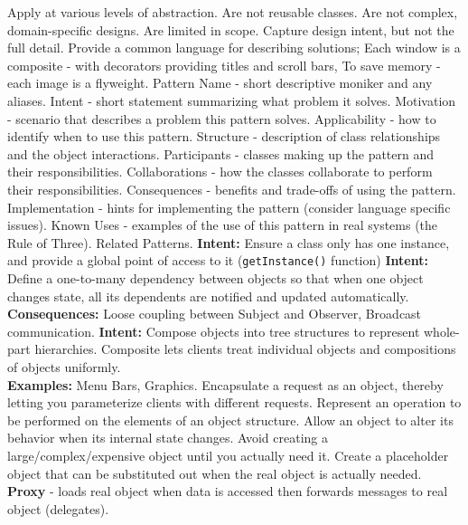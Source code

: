\documentclass[number]{assignment}
\begin{document}
\begin{landscape}
\begin{multicols}{3}
Apply at various levels of abstraction. Are not reusable classes. Are not complex, domain-specific designs. Are limited in scope. Capture design intent, but not the full detail.
Provide a common language for describing solutions; Each window is a composite - with decorators providing titles and scroll bars, To save memory - each image is a flyweight.
Pattern Name - short descriptive moniker and any aliases. Intent - short statement summarizing what problem it solves. Motivation - scenario that describes a problem this pattern solves. Applicability - how to identify when to use this pattern. Structure - description of class relationships and the object interactions. Participants - classes making up the pattern and their responsibilities. Collaborations - how the classes collaborate to perform their responsibilities. Consequences - benefits and trade-offs of using the pattern. Implementation - hints for implementing the pattern (consider language specific issues). Known Uses - examples of the use of this pattern in real systems (the Rule of Three). Related Patterns.
\textbf{Intent:} Ensure a class only has one instance, and provide a global point of access to it (\texttt{getInstance()} function)
\textbf{Intent:} Define a one-to-many dependency between objects so that when one object changes state, all its dependents are notified and updated automatically.\\
\textbf{Consequences:} Loose coupling between Subject and Observer, Broadcast communication.
\textbf{Intent:} Compose objects into tree structures to represent whole-part hierarchies. Composite lets clients treat individual objects and compositions of objects uniformly.\\
\textbf{Examples:} Menu Bars, Graphics.
Encapsulate a request as an object, thereby letting you parameterize clients with different requests.
Represent an operation to be performed on the elements of an object structure.
Allow an object to alter its behavior when its internal state changes.
Avoid creating a large/complex/expensive object until you actually need it. Create a placeholder object that can be substituted out when the real object is actually needed.\\
\textbf{Proxy} - loads real object when data is accessed then forwards messages to real object (delegates).\\

\end{multicols}
\end{landscape}
\end{document}
